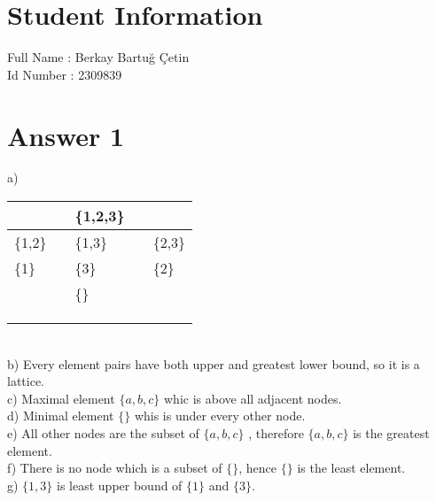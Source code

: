 \documentclass[12pt]{article}
\begin{document}
\section*{Student Information } 
Full Name :  Berkay Bartuğ Çetin\\
Id Number : 2309839\\

\section*{Answer 1}
a)


\begin{tabular}{ll|l|ll} 
\cline{3-3}
                              &                      & \{1,2,3\}            &                       &                               \\ 
\hline
\multicolumn{1}{|l|}{\{1,2\}} &                      & \{1,3\}              & \multicolumn{1}{l|}{} & \multicolumn{1}{l|}{\{2,3\}}  \\ 
\hline
\multicolumn{1}{|l|}{\{1\}}   &                      & \{3\}                & \multicolumn{1}{l|}{} & \multicolumn{1}{l|}{\{2\}}    \\ 
\hline
                              &                      & \{\}                 &                       &                               \\ 
\cline{3-3}
                              & \multicolumn{1}{l}{} & \multicolumn{1}{l}{} &                       &                               \\
                              & \multicolumn{1}{l}{} & \multicolumn{1}{l}{} &                       &                               \\
                              & \multicolumn{1}{l}{} & \multicolumn{1}{l}{} &                       &                              
\end{tabular}
\\
b) Every element pairs have both upper and greatest lower bound, so it is a lattice. \\
c) Maximal element $\{a,b,c\}$ whic is above all adjacent nodes. \\
d) Minimal element $\{\}$ whis is under every other node.\\
e) All other nodes are the subset of $\{ a,b,c \}$ , therefore $\{ a,b,c \}$ is the greatest element. \\
f) There is no node which is a subset of $\{\}$, hence $\{\}$ is the least element. \\
g) $\{1,3\}$ is least upper bound of $\{1\}$ and $\{3\}$. \\
\end{document}
